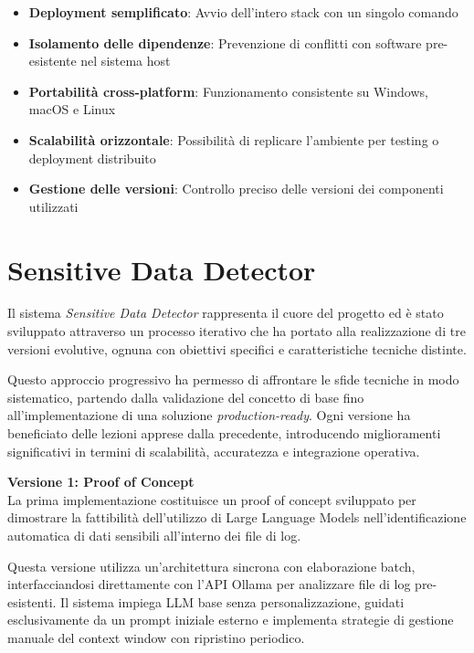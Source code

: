 \documentclass[12pt]{report}
\begin{document}
\begin{itemize}
    \item \textbf{Deployment semplificato}: Avvio dell'intero stack con un singolo comando
    \item \textbf{Isolamento delle dipendenze}: Prevenzione di conflitti con software pre-esistente nel sistema host
    \item \textbf{Portabilità cross-platform}: Funzionamento consistente su Windows, macOS e Linux
    \item \textbf{Scalabilità orizzontale}: Possibilità di replicare l'ambiente per testing o deployment distribuito
    \item \textbf{Gestione delle versioni}: Controllo preciso delle versioni dei componenti utilizzati
\end{itemize}



%
%

\chapter{Sensitive Data Detector}
\label{chap:sensitive_data_detector}

Il sistema \textit{Sensitive Data Detector} rappresenta il cuore del progetto ed è stato sviluppato attraverso un processo iterativo che ha portato alla realizzazione di tre versioni evolutive, ognuna con obiettivi specifici e caratteristiche tecniche distinte.

Questo approccio progressivo ha permesso di affrontare le sfide tecniche in modo sistematico, partendo dalla validazione del concetto di base fino all'implementazione di una soluzione \textit{production-ready}. Ogni versione ha beneficiato delle lezioni apprese dalla precedente, introducendo miglioramenti significativi in termini di scalabilità, accuratezza e integrazione operativa.

\textbf{Versione 1: Proof of Concept} \\
La prima implementazione costituisce un proof of concept sviluppato per dimostrare la fattibilità dell'utilizzo di Large Language Models nell'identificazione automatica di dati sensibili all'interno dei file di log.

Questa versione utilizza un'architettura sincrona con elaborazione batch, interfacciandosi direttamente con l'API Ollama per analizzare file di log pre-esistenti. Il sistema impiega LLM base senza personalizzazione, guidati esclusivamente da un prompt iniziale esterno e implementa strategie di gestione manuale del context window con ripristino periodico.
\end{document}
